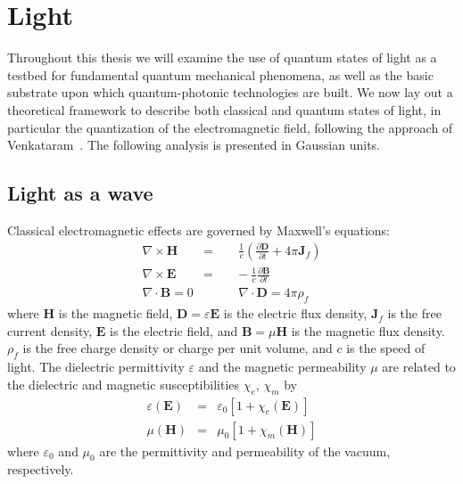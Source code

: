 \section{Light}
\label{sec:light}
Throughout this thesis we will examine the use of quantum states of light as a testbed for fundamental quantum mechanical phenomena, as well as the basic substrate upon which quantum-photonic technologies are built. We now lay out a theoretical framework to describe both classical and quantum states of light, in particular the quantization of the electromagnetic field, following the approach of Venkataram~\cite{Venkataram2013}. The following analysis is presented in Gaussian units.

\subsection{Light as a wave}

\newcommand{\efield}{\mathbf{E}}
\newcommand{\hfield}{\mathbf{H}}
\newcommand{\bfield}{\mathbf{B}}
\newcommand{\dfield}{\mathbf{D}}
\newcommand{\jfield}{\mathbf{J}}
\newcommand{\afield}{\mathbf{A}}
\newcommand{\vr}{\mathbf{r}}
\newcommand{\vk}{\mathbf{k}}
\newcommand{\createk}{\creation_\vk}
\newcommand{\deletek}{\annihilation_\vk}

Classical electromagnetic effects are governed by Maxwell's equations:
\begin{eqnarray}
    \nabla \times \hfield &=& \frac{1}{c}\left( \frac{\partial\dfield}{\partial t} + 4\pi \jfield_f \right) \label{eqn:faraday} \\ 
    \nabla \times \efield &=& -~ \frac{1}{c} \frac{\partial\bfield}{\partial t} \label{eqn:ampere}\\
    \nabla \cdot \bfield = 0 &\qquad
    & \nabla \cdot \dfield =  4\pi \rho_f  \label{eqn:gauss}
\end{eqnarray}
where $\hfield$ is the magnetic field, 
$\dfield=\varepsilon\efield$ is the electric flux density, $\jfield_f$ is the free current density, $\efield$ is the electric field, and $\bfield=\mu\hfield$ is the magnetic flux density. $\rho_f$ is the free charge density or charge per unit volume, and $c$ is the speed of light.
The dielectric permittivity $\varepsilon$ and the magnetic permeability $\mu$ are related to the dielectric and magnetic susceptibilities $\chi_e$, $\chi_m$ by 
\begin{eqnarray}
\varepsilon(\efield) &=& \varepsilon_0\left[1+\chi_e\left(\efield\right)\right]
    \label{eqn:dielectric-susceptibility}
    \\
\mu(\hfield) &=& \mu_0\left[1+\chi_m\left(\hfield\right)\right]
\end{eqnarray}
where $\varepsilon_0$ and $\mu_0$ are the permittivity and permeability of the vacuum, respectively.

